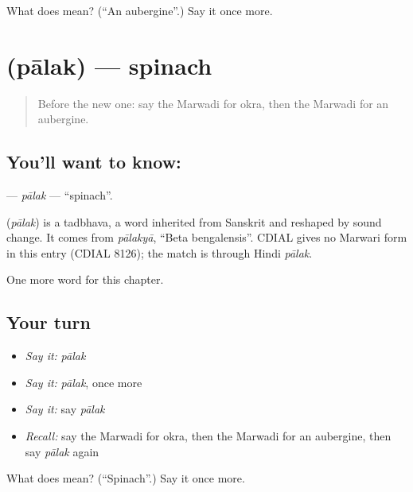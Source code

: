 \begin{tcolorbox}[breakable,colback=teal!4,colframe=teal!35!black,title={Before you move on}]
What does  mean? (\textquotedblleft{}An aubergine\textquotedblright{}.) Say it once more.
\end{tcolorbox}
\section[\texorpdfstring{\mw{पालक} (pālak)}{पालक (pālak)}]{ (pālak) — spinach}

\label{lesson:MW-C135-palak}



\begin{quote}
Before the new one: say the Marwadi for okra, then the Marwadi for an aubergine.
\end{quote}

\subsection*{You'll want to know: }
\textbf{} — \emph{pālak} — \textquotedblleft{}spinach\textquotedblright{}.

\begin{cousinweb}
\textbf{} (\emph{pālak}) is a tadbhava, a word inherited from Sanskrit and reshaped by sound change. It comes from \emph{pālakyā}, \textquotedblleft{}Beta bengalensis\textquotedblright{}. CDIAL gives no Marwari form in this entry (CDIAL 8126); the match is through Hindi \emph{pālak}.
\end{cousinweb}

\begin{grammarlens}[title={What you've built}]
One more word for this chapter.
\end{grammarlens}

\subsection*{Your turn}
\begin{itemize}
\raggedright
  \item \emph{Say it:} \emph{pālak}
  \item \emph{Say it:} \emph{pālak}, once more
  \item \emph{Say it:} say \emph{pālak}
  \item \emph{Recall:} say the Marwadi for okra, then the Marwadi for an aubergine, then say \emph{pālak} again
\end{itemize}

\begin{tcolorbox}[breakable,colback=teal!4,colframe=teal!35!black,title={Before you move on}]
What does  mean? (\textquotedblleft{}Spinach\textquotedblright{}.) Say it once more.
\end{tcolorbox}
